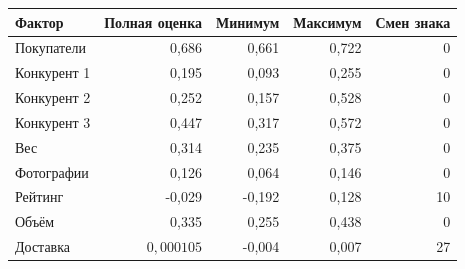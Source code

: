 \begin{tabular}{lrrrr}
\toprule
Фактор & Полная оценка & Минимум & Максимум & Смен знака \\
\midrule
Покупатели & 0,686 & 0,661 & 0,722 & 0 \\
Конкурент 1 & 0,195 & 0,093 & 0,255 & 0 \\
Конкурент 2 & 0,252 & 0,157 & 0,528 & 0 \\
Конкурент 3 & 0,447 & 0,317 & 0,572 & 0 \\
Вес & 0,314 & 0,235 & 0,375 & 0 \\
Фотографии & 0,126 & 0,064 & 0,146 & 0 \\
Рейтинг & -0,029 & -0,192 & 0,128 & 10 \\
Объём & 0,335 & 0,255 & 0,438 & 0 \\
Доставка & $0{,}000105$ & -0,004 & 0,007 & 27 \\
\bottomrule
\end{tabular}
